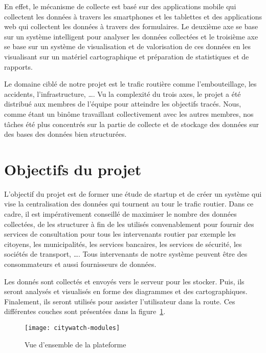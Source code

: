 En effet, le mécanisme de collecte est basé sur des applications mobile qui
collectent les données à travers les smartphones et les tablettes et des
applications web qui collectent les données à travers des formulaires. Le
deuxième axe se base sur un système intelligent pour analyser les données
collectées et le troisième axe se base sur un système de visualisation et de
valorisation de ces données en les visualisant sur un matériel cartographique
et préparation de statistiques et de rapports.

Le domaine ciblé de notre projet est le trafic routière comme l'embouteillage,
les accidents, l'infrastructure, \ldots.  Vu la complexité du trois axes, le
projet a été distribué aux membres de l'équipe  pour
atteindre les objectifs tracés. Nous, comme étant un binôme travaillant
collectivement avec les autres membres, nos tâches été plus concentrés sur la
partie de collecte et de stockage des données sur des bases des données bien
structurées.

\section{Objectifs du projet}

L'objectif du projet  est de former une étude de startup
et de créer un système qui vise la centralisation des données qui tournent au
tour le trafic routier. Dans ce cadre, il est impérativement conseillé de
maximiser le nombre des données collectées, de les structurer à fin de les
utilisés convenablement pour fournir des services de consultation pour tous les
intervenants routier par exemple les citoyens, les municipalités, les services
bancaires, les services de sécurité, les sociétés de transport, \ldots.  Tous
intervenants de notre système peuvent être des consommateurs et aussi
fournisseurs de données.

Les donnés sont collectés et envoyés vers le serveur pour les stocker. Puis,
ils seront analysés et visualisés en forme des diagrammes et des cartographiques.
Finalement, ils seront utilisés pour assister l'utilisateur dans la route.
Ces différentes couches sont présentées dans la figure~\ref{fig:citywatch-modules}.

\begin{figure}[!h]
    \centering
    \texttt{[image: citywatch-modules]}
    \caption{Vue d'ensemble de la plateforme }
\label{fig:citywatch-modules}
\end{figure}

